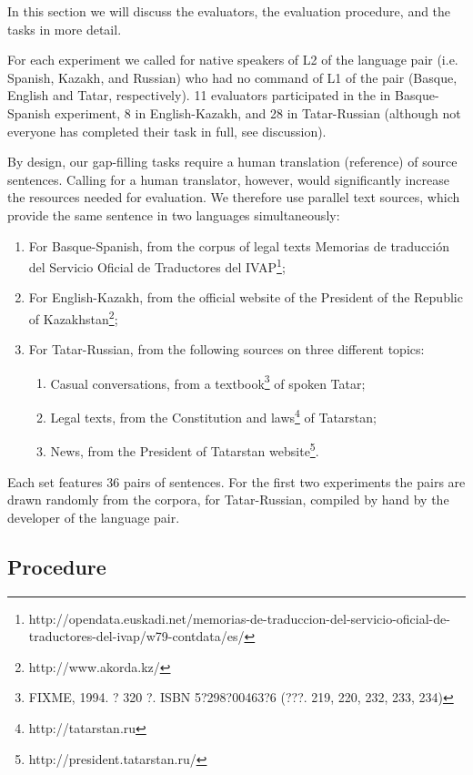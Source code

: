 \documentclass[11pt]{article}
\newcommand{\comment}[1]{\marginpar{\scriptsize\sf \textcolor{blue}{#1}}}
\begin{document}
In this section we will discuss the evaluators, the evaluation procedure, and the tasks in more detail.

For each experiment we called for native speakers of L2 of the language pair (i.e.
Spanish, Kazakh, and Russian) who had no command of L1 of the pair (Basque, English
and Tatar, respectively). 11 evaluators participated in the in Basque-Spanish experiment, 8 in
English-Kazakh, and 28 in Tatar-Russian (although not everyone has completed their task
in full, see discussion).

\comment{EA: maybe I should put this into the previous section?}
By design, our gap-filling tasks require a human translation (reference) of source sentences. Calling for a human translator, however, would significantly increase the resources needed for evaluation. We therefore use parallel text sources, which provide the same sentence in two languages simultaneously:
\begin{enumerate}
\item  For Basque-Spanish, from the corpus of legal texts Memorias de traducci\'on del
Servicio Oficial de Traductores del IVAP\footnote{http://opendata.euskadi.net/memorias-de-traduccion-del-servicio-oficial-de-traductores-del-ivap/w79-contdata/es/};
\item  For English-Kazakh, from the official website of the President of the Republic of
Kazakhstan\footnote{http://www.akorda.kz/};
\item  For Tatar-Russian, from the following sources on three different topics:
  \begin{enumerate}
\comment{EA: whoops, what is the best way to make it understand cyrillic?}
    \item  Casual conversations, from a textbook\footnote{FIXME, 1994. ? 320 ?. ISBN 5?298?00463?6 (???. 219, 220, 232, 233, 234)} of spoken Tatar;
    \item  Legal texts, from the Constitution and laws\footnote{http://tatarstan.ru} of Tatarstan;
    \item  News, from the President of Tatarstan website\footnote{http://president.tatarstan.ru/}.
  \end{enumerate}
\end{enumerate}

Each set features 36 pairs of sentences. For the first two experiments the pairs are drawn
randomly from the corpora, for Tatar-Russian, compiled by hand by the developer of the
language pair.

\subsection{Procedure}
\end{document}
